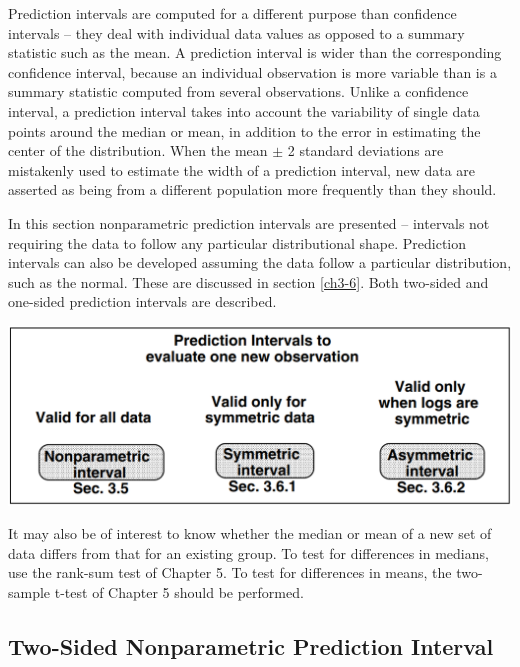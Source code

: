 \documentclass[]{book}
\begin{document}
Prediction intervals are computed for a different purpose than confidence intervals -- they deal with individual data values as opposed to a summary statistic such as the mean. A prediction interval is wider than the corresponding confidence interval, because an individual observation is more variable than is a summary statistic computed from several observations. Unlike a confidence interval, a prediction interval takes into account the variability of single data points around the median or mean, in addition to the error in estimating the center of the distribution. When the mean \(\pm\) 2 standard deviations are mistakenly used to estimate the width of a prediction interval, new data are asserted as being from a different population more frequently than they should.

In this section nonparametric prediction intervals are presented -- intervals not requiring the data to follow any particular distributional shape. Prediction intervals can also be developed assuming the data follow a particular distribution, such as the normal. These are discussed in section \ref{ch3-6}. Both two-sided and one-sided prediction intervals are described.

\begin{center}\includegraphics[width=14.76in]{figures/3_C} \end{center}

It may also be of interest to know whether the median or mean of a new set of data differs from that for an existing group. To test for differences in medians, use the rank-sum test of Chapter 5. To test for differences in means, the two-sample t-test of Chapter 5 should be performed.

\hypertarget{two-sided-nonparametric-prediction-interval}{%
\subsection{Two-Sided Nonparametric Prediction Interval}\label{two-sided-nonparametric-prediction-interval}}
\end{document}
